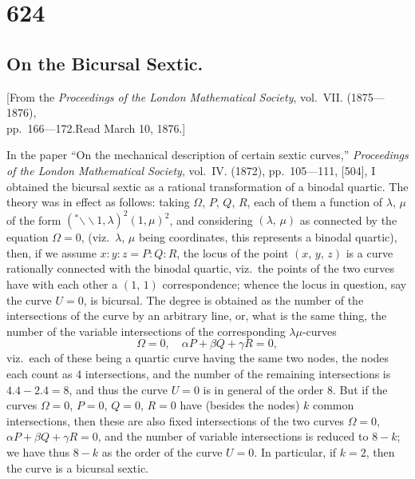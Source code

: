 \documentclass[12pt,a4paper]{article}
\begin{document}
\newpage

\section*{624}
\subsection*{On the Bicursal Sextic.}

\begin{center}
\small
[From the \textit{Proceedings of the London Mathematical Society}, vol.~VII. (1875---1876),\\
pp.~166---172.\quad Read March 10, 1876.]
\end{center}

\medskip
\noindent
In the paper ``On the mechanical description of certain sextic curves,'' \textit{Proceedings of the London Mathematical Society}, vol.~IV. (1872), pp.~105---111, [504], I obtained the bicursal sextic as a rational transformation of a binodal quartic. The theory was in effect as follows: taking $\Omega$, $P$, $Q$, $R$, each of them a function of $\lambda$, $\mu$ of the form $({}^*\!\!\mathbin{\backslash\!\!\backslash}\! 1,\lambda)^2(1,\mu)^2$, and considering $(\lambda,\,\mu)$ as connected by the equation $\Omega=0$, (viz.\ $\lambda$, $\mu$ being coordinates, this represents a binodal quartic), then, if we assume $x:y:z = P:Q:R$, the locus of the point $(x,\,y,\,z)$ is a curve rationally connected with the binodal quartic, viz.\ the points of the two curves have with each other a $(1,\,1)$ correspondence; whence the locus in question, say the curve $U=0$, is bicursal. The degree is obtained as the number of the intersections of the curve by an arbitrary line, or, what is the same thing, the number of the variable intersections of the corresponding $\lambda\mu$-curves
\[
\Omega = 0, \quad \alpha P + \beta Q + \gamma R = 0,
\]
viz.\ each of these being a quartic curve having the same two nodes, the nodes each count as 4 intersections, and the number of the remaining intersections is $4.4 - 2.4 = 8$, and thus the curve $U=0$ is in general of the order 8. But if the curves $\Omega=0$, $P=0$, $Q=0$, $R=0$ have (besides the nodes) $k$ common intersections, then these are also fixed intersections of the two curves $\Omega=0$, $\alpha P+\beta Q+\gamma R=0$, and the number of variable intersections is reduced to $8-k$; we have thus $8-k$ as the order of the curve $U=0$. In particular, if $k=2$, then the curve is a bicursal sextic.
\end{document}
